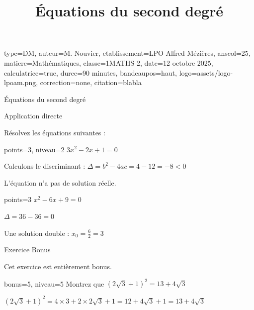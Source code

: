 \documentclass[theme=vert]{nfdevoirs}
\title{Équations du second degré}
\begin{document}
\begin{devoir}{
        type=DM,
        auteur={M. Nouvier},
        etablissement={LPO Alfred Mézières},
        anscol=25,
        matiere={Mathématiques},
        classe={1MATHS 2},
        date={12 octobre 2025},
        calculatrice=true,
        duree={90 minutes},
        bandeaupos=haut,
        logo={assets/logo-lpoam.png},
        correction=none,
        citation={blabla}
    }

    \begin{partie}{Équations du second degré}

        \begin{exercice}{Application directe}

            Résolvez les équations suivantes :

            \begin{question}{points=3, niveau=2}
                $3x^2 - 2x + 1 = 0$
            \end{question}

            \begin{correction}
                Calculons le discriminant : $\Delta = b^2 - 4ac = 4 - 12 = -8 < 0$

                L'équation n'a pas de solution réelle.
            \end{correction}

            \begin{question}{points=3}
                $x^2 - 6x + 9 = 0$
            \end{question}

            \begin{correction}
                $\Delta = 36 - 36 = 0$

                Une solution double : $x_0 = \frac{6}{2} = 3$
            \end{correction}

        \end{exercice}

        \begin{exercice}{Exercice Bonus}

            Cet exercice est entièrement bonus.

            \begin{question}{bonus=5, niveau=5}
                Montrez que $(2\sqrt{3} + 1)^2 = 13 + 4\sqrt{3}$
            \end{question}

            \begin{correction}
                $(2\sqrt{3} + 1)^2 = 4 \times 3 + 2 \times 2\sqrt{3} + 1 = 12 + 4\sqrt{3} + 1 = 13 + 4\sqrt{3}$
            \end{correction}


\end{exercice}
\end{partie}
\end{devoir}
\end{document}
